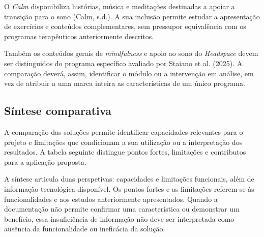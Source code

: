 O \textit{Calm} disponibiliza histórias, música e meditações destinadas a apoiar a transição para o sono (Calm, s.d.). A sua inclusão permite estudar a apresentação de exercícios e conteúdos complementares, sem pressupor equivalência com os programas terapêuticos anteriormente descritos.

Também os conteúdos gerais de \textit{mindfulness} e apoio ao sono do \textit{Headspace} devem ser distinguidos do programa específico avaliado por Staiano et al. (2025). A comparação deverá, assim, identificar o módulo ou a intervenção em análise, em vez de atribuir a uma marca inteira as características de um único programa.

\subsection{Síntese comparativa}

A comparação das soluções permite identificar capacidades relevantes para o projeto e limitações que condicionam a sua utilização ou a interpretação dos resultados. A tabela seguinte distingue pontos fortes, limitações e contributos para a aplicação proposta.

A síntese articula duas perspetivas: capacidades e limitações funcionais, além de informação tecnológica disponível. Os pontos fortes e as limitações referem-se às funcionalidades e aos estudos anteriormente apresentados. Quando a documentação não permite confirmar uma característica ou demonstrar um benefício, essa insuficiência de informação não deve ser interpretada como ausência da funcionalidade ou ineficácia da solução.

\renewcommand{\arraystretch}{1.3} %

